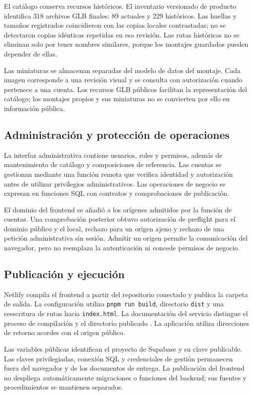 \documentclass[12pt,letterpaper]{article}
\newcommand{\ruta}[1]{{\urlstyle{tt}\nolinkurl{#1}}}
\begin{document}
El catálogo conserva recursos históricos. El inventario versionado de producto identifica 318 archivos GLB finales: 89 actuales y 229 históricos. Las huellas y tamaños registrados coincidieron con las copias locales contrastadas; no se detectaron copias idénticas repetidas en esa revisión. Las rutas históricas no se eliminan solo por tener nombres similares, porque los montajes guardados pueden depender de ellas.

Las miniaturas se almacenan separadas del modelo de datos del montaje. Cada imagen corresponde a una revisión visual y se consulta con autorización cuando pertenece a una cuenta. Los recursos GLB públicos facilitan la representación del catálogo; los montajes propios y sus miniaturas no se convierten por ello en información pública.

\subsection{Administración y protección de operaciones}
La interfaz administrativa contiene usuarios, roles y permisos, además de mantenimiento de catálogo y composiciones de referencia. Las cuentas se gestionan mediante una función remota que verifica identidad y autorización antes de utilizar privilegios administrativos. Las operaciones de negocio se expresan en funciones SQL con contratos y comprobaciones de publicación.

El dominio del frontend se añadió a los orígenes admitidos por la función de cuentas. Una comprobación posterior obtuvo autorización de preflight para el dominio público y el local, rechazo para un origen ajeno y rechazo de una petición administrativa sin sesión. Admitir un origen permite la comunicación del navegador, pero no reemplaza la autenticación ni concede permisos de negocio.

\subsection{Publicación y ejecución}
Netlify compila el frontend a partir del repositorio conectado y publica la carpeta de salida. La configuración utiliza \ruta{pnpm run build}, directorio \ruta{dist} y una reescritura de rutas hacia \ruta{index.html}. La documentación del servicio distingue el proceso de compilación y el directorio publicado \citep{netlify}. La aplicación utiliza direcciones de retorno acordes con el origen público.

Las variables públicas identifican el proyecto de Supabase y su clave publicable. Las claves privilegiadas, conexión SQL y credenciales de gestión permanecen fuera del navegador y de los documentos de entrega. La publicación del frontend no despliega automáticamente migraciones o funciones del backend; sus fuentes y procedimientos se mantienen separados.
\end{document}

